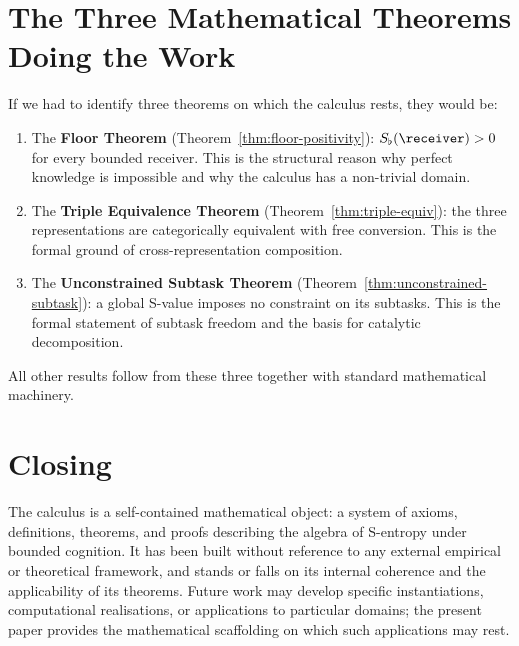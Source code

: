 \documentclass[11pt,a4paper]{article}
\theoremstyle{thmstyle}
\theoremstyle{thmstyle}
\theoremstyle{definition}
\theoremstyle{remark}
\newcommand{\Sfloor}{S_{\flat}}
\begin{document}
\section{The Three Mathematical Theorems Doing the Work}
\label{sec:three-key-theorems}

If we had to identify three theorems on which the
calculus rests, they would be:

\begin{enumerate}[label=\textbf{T\arabic*.},leftmargin=*]
\item The \textbf{Floor Theorem}
      (Theorem~\ref{thm:floor-positivity}):
      $\Sfloor(\receiver) > 0$ for every bounded
      receiver.  This is the structural reason why
      perfect knowledge is impossible and why the
      calculus has a non-trivial domain.
\item The \textbf{Triple Equivalence Theorem}
      (Theorem~\ref{thm:triple-equiv}): the three
      representations are categorically equivalent
      with free conversion.  This is the formal
      ground of cross-representation composition.
\item The \textbf{Unconstrained Subtask Theorem}
      (Theorem~\ref{thm:unconstrained-subtask}):
      a global S-value imposes no constraint on
      its subtasks.  This is the formal statement
      of subtask freedom and the basis for
      catalytic decomposition.
\end{enumerate}

All other results follow from these three together
with standard mathematical machinery.

\section{Closing}
\label{sec:closing}

The calculus is a self-contained mathematical
object: a system of axioms, definitions,
theorems, and proofs describing the algebra of
S-entropy under bounded cognition.  It has been
built without reference to any external
empirical or theoretical framework, and stands
or falls on its internal coherence and the
applicability of its theorems.  Future work may
develop specific instantiations, computational
realisations, or applications to particular
domains; the present paper provides the
mathematical scaffolding on which such
applications may rest.



\end{document}
